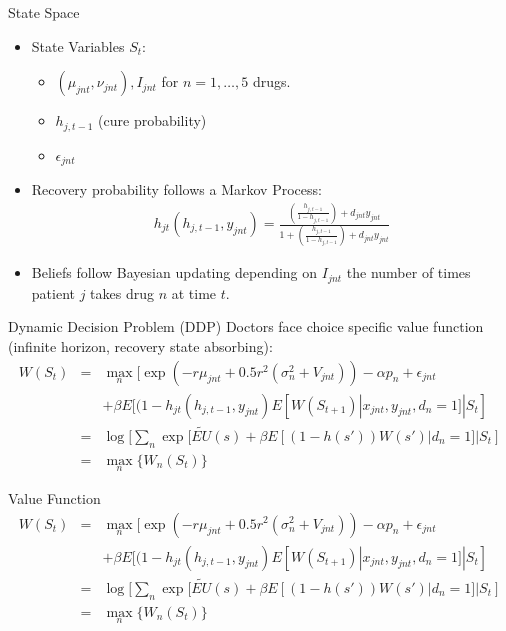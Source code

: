 \begin{frame}{State Space}
\begin{itemize}
\item State Variables $S_t$:
\begin{itemize}
\item $(\mu_{jnt},\nu_{jnt}), I_{jnt}$ for $n=1,\ldots,5$ drugs.
\item $h_{j,t-1}$ (cure probability)
\item $\epsilon_{jnt}$
\end{itemize}
\item Recovery probability follows a Markov Process:
\begin{eqnarray*}
h_{jt}(h_{j,t-1},y_{jnt}) = \frac{ \left(\frac{h_{j,t-1}}{1-h_{j,t-1}} \right) + d_{jnt} y_{jnt}}  {1+ \left(\frac{h_{j,t-1}}{1-h_{j,t-1}} \right) + d_{jnt} y_{jnt}}  
\end{eqnarray*}
\item Beliefs follow Bayesian updating depending on $I_{jnt}$ the number of times patient $j$ takes drug $n$ at time $t$.
\end{itemize}
\end{frame}

\begin{frame}{Dynamic Decision Problem (DDP)}
Doctors face choice specific value function (infinite horizon, recovery state absorbing):
\begin{eqnarray*}
W(S_t) &=& \max_n [\exp(-r\mu_{jnt} + 0.5r^2(\sigma_n^2 + V_{jnt})) - \alpha p_n + \epsilon_{jnt}\\
&&+ \beta E[(1-h_{jt}(h_{j,t-1},y_{jnt}) E[W(S_{t+1}) | x_{jnt},y_{jnt},d_n=1] | S_t]\\
&=& \log [ \sum_n \exp[ \tilde{EU}(s) + \beta E[(1-h(s'))W(s') | d_n=1] | S_t] \\
&=& \max_n \{W_n(S_t)\}
\end{eqnarray*}
\end{frame}

\begin{frame}{Value Function}
\begin{eqnarray*}
W(S_t) &=& \max_n [\exp(-r\mu_{jnt} + 0.5r^2(\sigma_n^2 + V_{jnt})) - \alpha p_n + \epsilon_{jnt}\\
&&+ \beta E[(1-h_{jt}(h_{j,t-1},y_{jnt}) E[W(S_{t+1}) | x_{jnt},y_{jnt},d_n=1] | S_t]\\
&=& \log [ \sum_n \exp[ \tilde{EU}(s) + \beta E[(1-h(s'))W(s') | d_n=1] | S_t] \\
&=& \max_n \{W_n(S_t)\}
\end{eqnarray*}
\end{frame}

